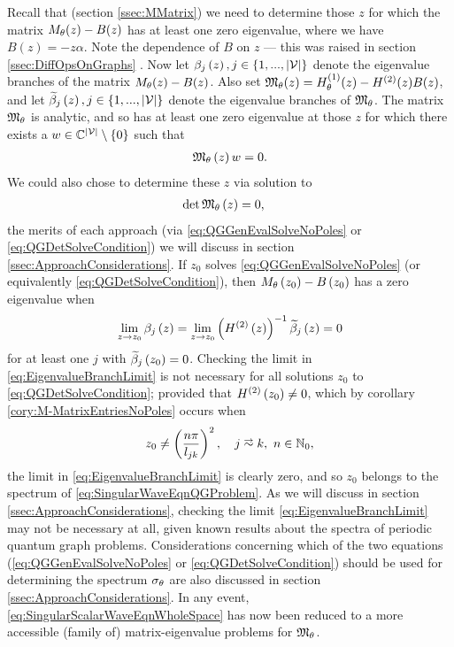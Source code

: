 Recall that (section \ref{ssec:MMatrix}) we need to determine those $z$ for which the matrix $M_\theta(z)-B(z)$ has at least one zero eigenvalue, where we have $B(z) = -z\alpha$.
Note the dependence of $B$ on $z$ --- this was raised in section \ref{ssec:DiffOpsOnGraphs} .
Now let $\beta_j\left( z \right), j\in\left\{ 1,...,\left\lvert \mathcal{V} \right\rvert \right\}$ denote the eigenvalue branches of the matrix $M_\theta(z)-B(z)$.
Also set $\mathfrak{M}_\theta(z) = H^{(1)}_\theta(z) - H^{(2)}(z)B(z)$, and let $\widetilde{\beta}_j\left( z \right), j\in\left\{ 1,...,\left\lvert \mathcal{V} \right\rvert \right\}$ denote the eigenvalue branches of $\mathfrak{M}_\theta$.
The matrix $\mathfrak{M}_\theta$ is analytic, and so has at least one zero eigenvalue at those $z$ for which there exists a $w\in\mathbb{C}^{\left\lvert \mathcal{V} \right\rvert}\setminus\left\{ 0 \right\}$ such that
\begin{align} \label{eq:QGGenEvalSolveNoPoles}
	\mathfrak{M}_\theta\left( z \right)w = 0.
\end{align}
We could also chose to determine these $z$ via solution to 
\begin{align} \label{eq:QGDetSolveCondition}
	\det\mathfrak{M}_\theta\left( z \right) &= 0,
\end{align}
the merits of each approach (via \eqref{eq:QGGenEvalSolveNoPoles} or \eqref{eq:QGDetSolveCondition}) we will discuss in section \ref{ssec:ApproachConsiderations}.
If $z_0$ solves \eqref{eq:QGGenEvalSolveNoPoles} (or equivalently \eqref{eq:QGDetSolveCondition}), then $M_{\theta}\left( z_0 \right)-B\left( z_0 \right)$ has a zero eigenvalue when
\begin{align} \label{eq:EigenvalueBranchLimit}
	\lim_{z\rightarrow z_0} \beta_j\left( z \right) = \lim_{z\rightarrow z_0} \left(  H^{(2)}\left( z \right)  \right)^{-1} \widetilde{\beta}_j\left( z \right) = 0
\end{align}
for at least one $j$ with $\widetilde{\beta}_j\left( z_0 \right)=0$.
Checking the limit in \eqref{eq:EigenvalueBranchLimit} is not necessary for all solutions $z_0$ to \eqref{eq:QGDetSolveCondition}; provided that $H^{(2)}\left( z_0 \right)\neq 0$, which by corollary \ref{cory:M-MatrixEntriesNoPoles} occurs when
\begin{align*}
	z_0 \neq \bracs{ \frac{n\pi}{l_{jk}} }^2, \quad j\conLeft k, \ n\in\naturals_{0},
\end{align*}
the limit in \eqref{eq:EigenvalueBranchLimit} is clearly zero, and so $z_0$ belongs to the spectrum of \eqref{eq:SingularWaveEqnQGProblem}.
As we will discuss in section \ref{ssec:ApproachConsiderations}, checking the limit \eqref{eq:EigenvalueBranchLimit} may not be necessary at all, given known results about the spectra of periodic quantum graph problems. 
Considerations concerning which of the two equations (\eqref{eq:QGGenEvalSolveNoPoles} or \eqref{eq:QGDetSolveCondition}) should be used for determining the spectrum $\sigma_\theta$ are also discussed in section \ref{ssec:ApproachConsiderations}.
In any event, \eqref{eq:SingularScalarWaveEqnWholeSpace} has now been reduced to a more accessible (family of) matrix-eigenvalue problems for $\mathfrak{M}_\theta$.


